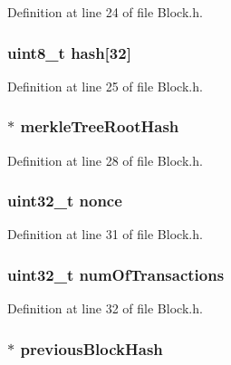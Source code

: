 Definition at line 24 of file Block.h.

\hypertarget{struct_m_i_block_a7ff9da008bf055da1f1ba994c562057d}{
\subsubsection[{hash}]{\setlength{\rightskip}{0pt plus 5cm}uint8\_\-t {\bf hash}\mbox{[}32\mbox{]}}}
\label{struct_m_i_block_a7ff9da008bf055da1f1ba994c562057d}


Definition at line 25 of file Block.h.

\hypertarget{struct_m_i_block_a04cf19a780652ad8d0123ed9fa18b408}{
\subsubsection[{merkleTreeRootHash}]{$\ast$ {\bf merkleTreeRootHash}}}
\label{struct_m_i_block_a04cf19a780652ad8d0123ed9fa18b408}


Definition at line 28 of file Block.h.

\hypertarget{struct_m_i_block_aa2f9785a9d9116cc4592db06375cb887}{
\subsubsection[{nonce}]{\setlength{\rightskip}{0pt plus 5cm}uint32\_\-t {\bf nonce}}}
\label{struct_m_i_block_aa2f9785a9d9116cc4592db06375cb887}


Definition at line 31 of file Block.h.

\hypertarget{struct_m_i_block_ac9749ca92207f8d50ecc2b0f904e2424}{
\subsubsection[{numOfTransactions}]{\setlength{\rightskip}{0pt plus 5cm}uint32\_\-t {\bf numOfTransactions}}}
\label{struct_m_i_block_ac9749ca92207f8d50ecc2b0f904e2424}


Definition at line 32 of file Block.h.

\hypertarget{struct_m_i_block_a942caf6700f7eee4a96b41503337886c}{
\subsubsection[{previousBlockHash}]{$\ast$ {\bf previousBlockHash}}}
\label{struct_m_i_block_a942caf6700f7eee4a96b41503337886c}



